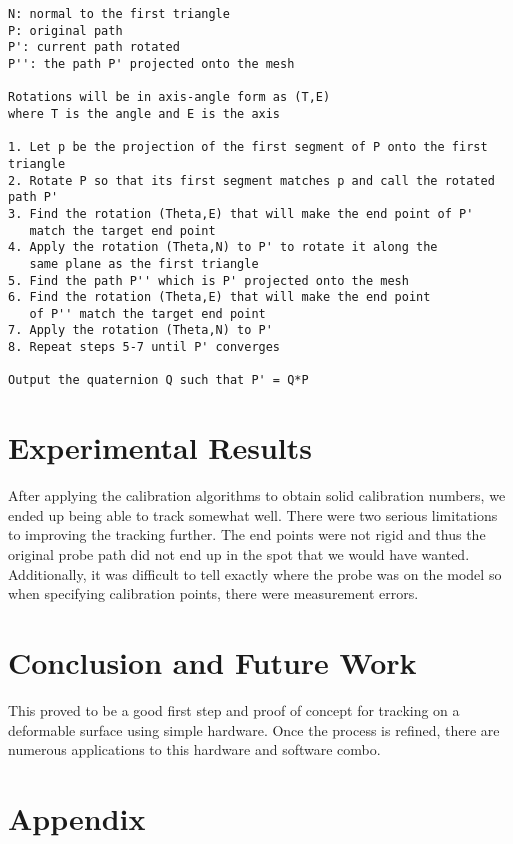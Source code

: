 \documentclass[11pt,psfig]{article}
\begin{document}
\begin{verbatim}
N: normal to the first triangle
P: original path
P': current path rotated
P'': the path P' projected onto the mesh

Rotations will be in axis-angle form as (T,E) 
where T is the angle and E is the axis

1. Let p be the projection of the first segment of P onto the first triangle
2. Rotate P so that its first segment matches p and call the rotated path P'
3. Find the rotation (Theta,E) that will make the end point of P' 
   match the target end point
4. Apply the rotation (Theta,N) to P' to rotate it along the 
   same plane as the first triangle
5. Find the path P'' which is P' projected onto the mesh
6. Find the rotation (Theta,E) that will make the end point 
   of P'' match the target end point
7. Apply the rotation (Theta,N) to P'
8. Repeat steps 5-7 until P' converges

Output the quaternion Q such that P' = Q*P

\end{verbatim}

\section*{Experimental Results}

After applying the calibration algorithms to obtain solid calibration numbers, we ended up being able to track somewhat well. There were two serious limitations to improving the tracking further. The end points were not rigid and thus the original probe path did not end up in the spot that we would have wanted. Additionally, it was difficult to tell exactly where the probe was on the model so when specifying calibration points, there were measurement errors. 

\section*{Conclusion and Future Work}

This proved to be a good first step and proof of concept for tracking on a deformable surface using simple hardware. Once the process is refined, there are numerous applications to this hardware and software combo. 





\section*{Appendix}


\end{document}

